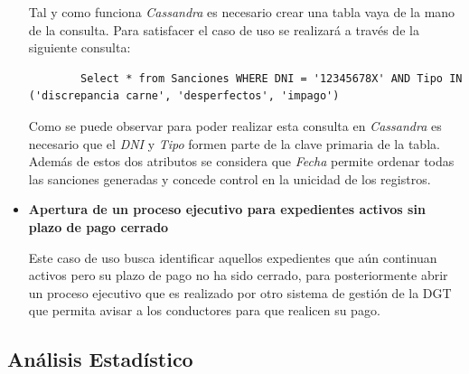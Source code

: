\documentclass[]{article}
\begin{document}
\begin{itemize}
    Tal y como funciona \textit{Cassandra} es necesario crear una tabla vaya de la mano de la consulta. Para satisfacer el caso de uso se realizará a través de la siguiente consulta:
    \begin{lstlisting}
        Select * from Sanciones WHERE DNI = '12345678X' AND Tipo IN ('discrepancia carne', 'desperfectos', 'impago') 
    \end{lstlisting}

    Como se puede observar para poder realizar esta consulta en \textit{Cassandra} es necesario que el \textit{DNI} y \textit{Tipo} formen parte de la clave primaria de la tabla. Además de estos dos atributos se considera que \textit{Fecha} permite ordenar todas las sanciones generadas y concede control en la unicidad de los registros. 
    \item \textbf{Apertura de un proceso ejecutivo para expedientes activos sin plazo de pago cerrado}
    
    Este caso de uso busca identificar aquellos expedientes que aún continuan activos pero su plazo de pago no ha sido cerrado, para posteriormente abrir un proceso ejecutivo que es realizado por otro sistema de gestión de la DGT que permita avisar a los conductores para que realicen su pago.
\end{itemize}

\subsection{Análisis Estadístico}
\label{subsec:analisis_estadistico}
\end{document}
